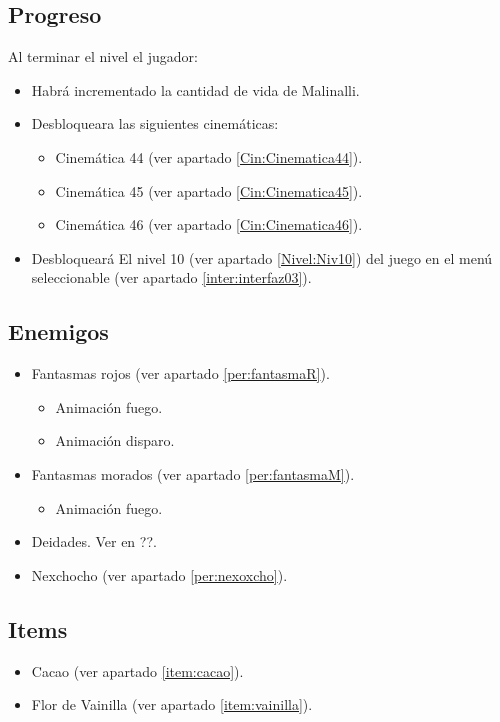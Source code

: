 	\subsection{Progreso}
		Al terminar el nivel el jugador:
\begin{itemize}
        \item Habrá incrementado la cantidad de vida de Malinalli. 
        \item Desbloqueara las siguientes cinemáticas:
\begin{itemize}
        \item Cinemática 44 (ver apartado \ref{Cin:Cinematica44}). 
        \item Cinemática 45 (ver apartado \ref{Cin:Cinematica45}).
        \item Cinemática 46 (ver apartado \ref{Cin:Cinematica46}).
\end{itemize}
        \item Desbloqueará El nivel 10 (ver apartado  \ref{Nivel:Niv10}) del juego en el menú seleccionable (ver apartado \ref{inter:interfaz03}). 
 \end{itemize}
	\subsection{Enemigos}
	\begin{itemize}
		\item Fantasmas rojos (ver apartado \ref{per:fantasmaR}).
		\begin{itemize}
				\item Animación fuego.
				\item Animación disparo.
			\end{itemize}
		\item Fantasmas morados (ver apartado \ref{per:fantasmaM}).
		\begin{itemize}
				\item Animación fuego.
			\end{itemize}
		\item Deidades. Ver en ??.
		\item Nexchocho (ver apartado \ref{per:nexoxcho}).
	\end{itemize}
	\subsection{Items}
\begin{itemize}
        \item   Cacao (ver apartado \ref{item:cacao}).
        \item Flor de Vainilla (ver apartado \ref{item:vainilla}).
\end{itemize}

